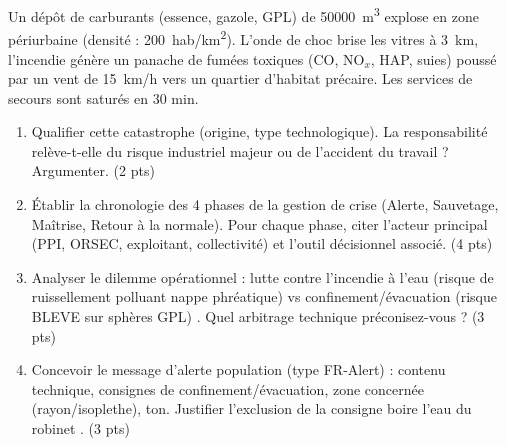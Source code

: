 \documentclass[11pt]{article}
\begin{document}
\begin{exercice}
Un dépôt de carburants (essence, gazole, GPL) de \SI{50000}{m^3} explose en zone périurbaine (densité : \SI{200}{hab/km^2}). L'onde de choc brise les vitres à \SI{3}{km}, l'incendie génère un panache de fumées toxiques (CO, NO$_x$, HAP, suies) poussé par un vent de \SI{15}{km/h} vers un quartier d'habitat précaire. Les services de secours sont saturés en 30 min.
\begin{enumerate}
    \item Qualifier cette catastrophe (origine, type technologique). La responsabilité relève-t-elle du \og risque industriel majeur \fg{} ou de l'accident du travail ? Argumenter. \hfill (2 pts)
    \item Établir la chronologie des 4 phases de la gestion de crise (Alerte, Sauvetage, Maîtrise, Retour à la normale). Pour chaque phase, citer l'acteur principal (PPI, ORSEC, exploitant, collectivité) et l'outil décisionnel associé. \hfill (4 pts)
    \item Analyser le dilemme opérationnel : \og lutte contre l'incendie à l'eau (risque de ruissellement polluant nappe phréatique) vs confinement/évacuation (risque BLEVE sur sphères GPL) \fg{}. Quel arbitrage technique préconisez-vous ? \hfill (3 pts)
    \item Concevoir le message d'alerte population (type FR-Alert) : contenu technique, consignes de confinement/évacuation, zone concernée (rayon/isoplethe), ton. Justifier l'exclusion de la consigne \og boire l'eau du robinet \fg{}. \hfill (3 pts)
\end{enumerate}
\end{exercice}
\end{document}

